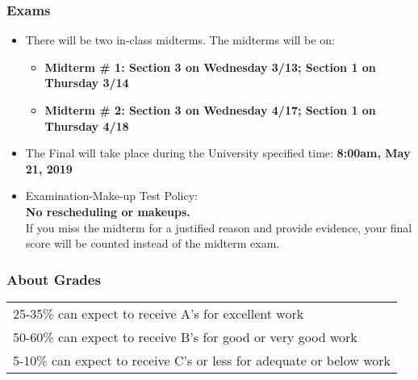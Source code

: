 \documentclass[9pt]{beamer}
\begin{document}

\begin{frame}[t]
\frametitle{Exams}
\begin{itemize}
\item There will be two in-class midterms. The midterms will be on:
\begin{itemize}
\medskip
\item\textbf{Midterm \# 1: Section 3 on Wednesday 3/13; Section 1 on Thursday 3/14}
\medskip
\item\textbf{Midterm \# 2: Section 3 on Wednesday 4/17; Section 1 on Thursday 4/18}
\end{itemize}
\bigskip
\item The Final will take place during the University specified time: \textbf{8:00am, May
21, 2019}
\bigskip
\item Examination-Make-up Test Policy:\\
\medskip
\textbf{No rescheduling or makeups.}\\
\medskip
If you miss the midterm for a justified reason and provide
evidence, your final score will be counted instead of the midterm exam.
\end{itemize}
\end{frame}
\begin{frame}[t]
\frametitle{About Grades}
\bigskip
\begin{table}[t]
\setlength {\tabcolsep}{3.75mm}
\vspace{0.01cm}
\renewcommand{\arraystretch}{1.75}
\begin{center}
\begin{tabular}{l}
\hline
25-35\% can expect to receive A's for excellent work \\
50-60\% can expect to receive B's for good or very good work \\
5-10\% can expect to receive C's or less for adequate or below work \\
\hline
\end{tabular}
\end{center}
\end{table}
\end{frame}
\end{document}
